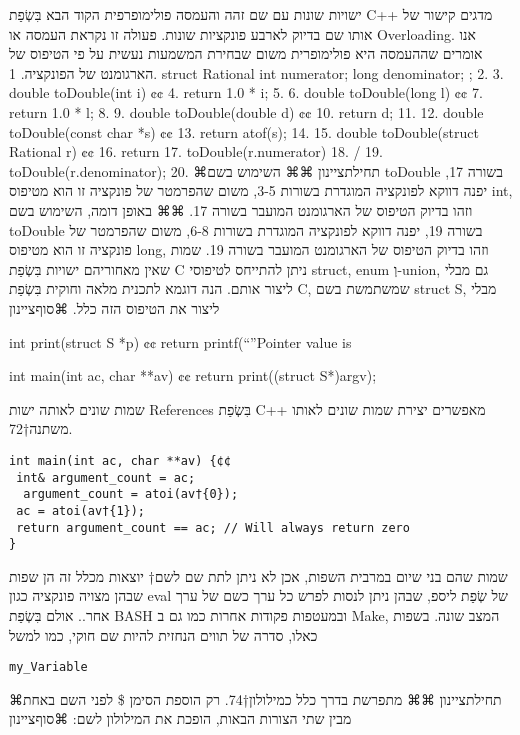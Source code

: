       ישויות שונות עם שם זהה והעמסה פולימופרפית
      הקוד הבא בִּשְׂפַת C++ מדגים קישור של אותו שם בדיוק לארבע פונקציות שונות. פעולה זו נקראת העמסה או Overloading. אנו אומרים שההעמסה היא פולימופרית משום שבחירת המשמעות נעשית על פי הטיפוס של הארגומנט של הפונקציה.
      1. struct Rational { int numerator; long denominator; };
      2. 3. double toDouble(int i) {¢¢
        4. return 1.0 * i;
      5. }
      6. double toDouble(long l) {¢¢
        7. return 1.0 * l;
      8. }
      9. double toDouble(double d) {¢¢
        10. return d;
      11. }
      12. double toDouble(const char *s) {¢¢
        13. return atof(s);
      14. }
      15. double toDouble(struct Rational r) {¢¢
        16. return
        17. toDouble(r.numerator)
        18. /
        19. toDouble(r.denominator);
      20. }
      ⌘תחילת{ציינון}
      ⌘⌘ השימוש בשם toDouble בשורה 17, יפנה דווקא לפונקציה המוגדרת בשורות 3-5, משום שהפרמטר של פונקציה זו הוא מטיפוס int, וזהו בדיוק הטיפוס של הארגומנט המועבר בשורה 17.
      ⌘⌘ באופן דומה, השימוש בשם toDouble בשורה 19, יפנה דווקא לפונקציה המוגדרת בשורות 6-8, משום שהפרמטר של פונקציה זו הוא מטיפוס long, וזהו בדיוק הטיפוס של הארגומנט המועבר בשורה 19.
      שמות שאין מאחוריהם ישויות
      בִּשְׂפַת C ניתן להתייחס לטיפוסי struct, enum וְ-union, גם מבלי ליצור אותם. הנה דוגמא לתכנית מלאה וחוקית בִּשְׂפַת C, שמשתמשת בשם struct S, מבלי ליצור את הטיפוס הזה כלל.
  ⌘סוף{ציינון}

      int print(struct S *p) {¢¢
        return printf(“”Pointer value is %
      }

      int main(int ac, char **av) {¢¢
        return print((struct S*)argv);
      }

      שמות שונים לאותה ישות
      References בִּשְׂפַת C++ מאפשרים יצירת שמות שונים לאותו משתנה†{72}.
\begin{verbatim}
int main(int ac, char **av) {¢¢
 int& argument_count = ac;
  argument_count = atoi(av†{0});
 ac = atoi(av†{1});
 return argument_count == ac; // Will always return zero
}
\end{verbatim}

      שמות שהם בני שיום
      במרבית השפות, אכן לא ניתן לתת שם לשם†{ יוצאות מכלל זה הן שפות שבהן מצויה פונקציה כגון eval של שְׂפַת ליספ, שבהן ניתן לנסות לפרש כל ערך כשם של ערך אחר.}. אולם בִּשְׂפַת BASH ובמעטפות פקודות אחרות כמו גם ב Make, המצב שונה. בשפות כאלו, סדרה של תווים הנחזית להיות שם חוקי, כמו למשל
\begin{verbatim}
my_Variable
\end{verbatim}
      ⌘תחילת{ציינון}
      ⌘⌘ מתפרשת בדרך כלל כמילולון†{74}. רק הוספת הסימן \$ לפני השם באחת מבין שתי הצורות הבאות, הופכת את המילולון לשם:
    ⌘סוף{ציינון}

